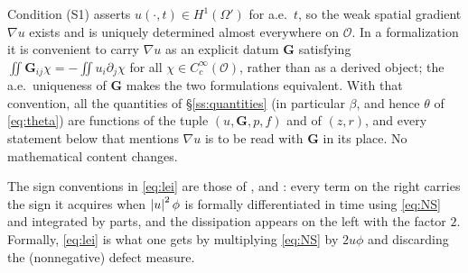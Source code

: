 \documentclass[11pt,reqno]{amsart}
\begin{document}
\begin{remark}\label{rem:gradient-datum}
Condition (S1) asserts $u(\cdot,t)\in H^{1}(\Omega')$ for a.e.\ $t$, so the weak
spatial gradient $\nabla u$ exists and is uniquely determined almost everywhere
on $\mathcal{O}$. In a formalization it is convenient to carry $\nabla u$ as an
explicit datum $\mathbf{G}$ satisfying
$\iint\mathbf{G}_{ij}\chi=-\iint u_{i}\partial_{j}\chi$ for all
$\chi\in C_{c}^{\infty}(\mathcal{O})$, rather than as a derived object; the
a.e.\ uniqueness of $\mathbf{G}$ makes the two formulations equivalent. With
that convention, all the quantities of \S\ref{ss:quantities} (in particular
$\beta$, and hence $\theta$ of \eqref{eq:theta}) are functions of the tuple
$(u,\mathbf{G},p,f)$ and of $(z,r)$, and every statement below that mentions
$\nabla u$ is to be read with $\mathbf{G}$ in its place. No mathematical content
changes.
\end{remark}

The sign conventions in \eqref{eq:lei} are those of \cite{CKN1982},
\cite{Lin1998} and \cite{Kukavica2008}: every term on the right carries the
sign it acquires when $\left\lvert u \right\rvert^{2}\phi$ is formally differentiated in time using
\eqref{eq:NS} and integrated by parts, and the dissipation appears on the left
with the factor $2$. Formally, \eqref{eq:lei} is what one gets by multiplying
\eqref{eq:NS} by $2u\phi$ and discarding the (nonnegative) defect measure.
\end{document}
